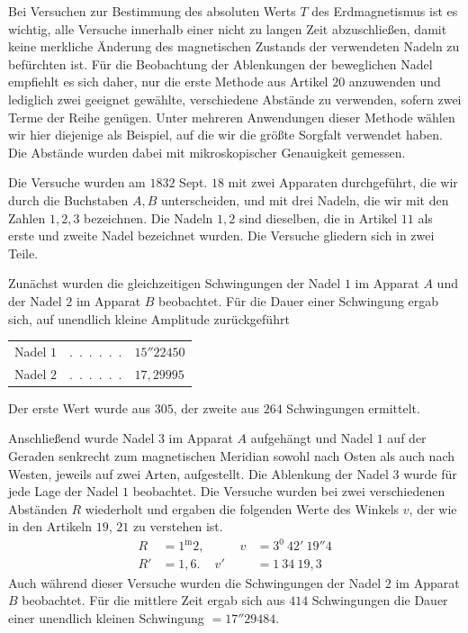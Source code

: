 Bei Versuchen zur Bestimmung des absoluten Werts $T$ des Erdmagnetismus ist es wichtig, alle Versuche innerhalb einer nicht zu langen Zeit abzuschließen, damit keine merkliche Änderung des magnetischen Zustands der verwendeten Nadeln zu befürchten ist. Für die Beobachtung der Ablenkungen der beweglichen Nadel empfiehlt es sich daher, nur die erste Methode aus Artikel $20$ anzuwenden und lediglich zwei geeignet gewählte, verschiedene Abstände zu verwenden, sofern zwei Terme der Reihe genügen. Unter mehreren Anwendungen dieser Methode wählen wir hier diejenige als Beispiel, auf die wir die größte Sorgfalt verwendet haben. Die Abstände wurden dabei mit mikroskopischer Genauigkeit gemessen.

Die Versuche wurden am $1832$ Sept. $18$ mit zwei Apparaten durchgeführt, die wir durch die Buchstaben $A,B$ unterscheiden, und mit drei Nadeln, die wir mit den Zahlen $1,2,3$ bezeichnen. Die Nadeln $1,2$ sind dieselben, die in Artikel $11$ als erste und zweite Nadel bezeichnet wurden. Die Versuche gliedern sich in zwei Teile.

Zunächst wurden die gleichzeitigen Schwingungen der Nadel $1$ im Apparat $A$ und der Nadel $2$ im Apparat $B$ beobachtet. Für die Dauer einer Schwingung ergab sich, auf unendlich kleine Amplitude zurückgeführt
\begin{center}
\begin{tabular}{lcl}
Nadel $1$&.\ .\ .\ .\ .\ .&$15''22450$\\
Nadel $2$&.\ .\ .\ .\ .\ .&$17{,}29995$
\end{tabular}
\end{center}
Der erste Wert wurde aus $305$, der zweite aus $264$ Schwingungen ermittelt.

Anschließend wurde Nadel $3$ im Apparat $A$ aufgehängt und Nadel $1$ auf der Geraden senkrecht zum magnetischen Meridian sowohl nach Osten als auch nach Westen, jeweils auf zwei Arten, aufgestellt. Die Ablenkung der Nadel $3$ wurde für jede Lage der Nadel $1$ beobachtet. Die Versuche wurden bei zwei verschiedenen Abständen $R$ wiederholt und ergaben die folgenden Werte des Winkels $v$, der wie in den Artikeln $19$, $21$ zu verstehen ist.
\[
\begin{aligned}
R&=1^{\mathrm m}2,&\qquad v&=3^0\ 42'\ 19''4\\
R'&=1{,}6.&v'&=1\ 34\ 19{,}3
\end{aligned}
\]
Auch während dieser Versuche wurden die Schwingungen der Nadel $2$ im Apparat $B$ beobachtet. Für die mittlere Zeit ergab sich aus $414$ Schwingungen die Dauer einer unendlich kleinen Schwingung $=17''29484$.

